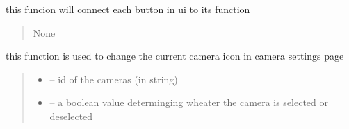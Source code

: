 \documentclass[letterpaper,10pt,english]{sphinxmanual}
\begin{document}
\begin{savenotes}
\begin{fulllineitems}
\begin{savenotes}
\begin{fulllineitems}
\end{fulllineitems}\end{savenotes}


\begin{savenotes}\begin{fulllineitems}
\label{\detokenize{setting/setting_UI:oxin.setting_UI.UI_main_window.buttonClick}}
\pysigstartsignatures
{}
\pysigstopsignatures
\sphinxAtStartPar
this funcion will connect each button in ui to its function
\begin{quote}\begin{description}
\sphinxAtStartPar
None

\end{description}\end{quote}

\end{fulllineitems}\end{savenotes}


\begin{savenotes}\begin{fulllineitems}
\label{\detokenize{setting/setting_UI:oxin.setting_UI.UI_main_window.change_camera_btn_icon}}
\pysigstartsignatures
{}
\pysigstopsignatures
\sphinxAtStartPar
this function is used to change the current camera icon in camera settings page
\begin{quote}\begin{description}
\begin{itemize}
\item {} 
\sphinxAtStartPar
{} – id of the cameras (in string)

\item {} 
\sphinxAtStartPar
{} – a boolean value determinging wheater the camera is selected or deselected


\end{itemize}
\end{description}
\end{quote}
\end{fulllineitems}
\end{savenotes}
\end{fulllineitems}
\end{savenotes}
\end{document}
